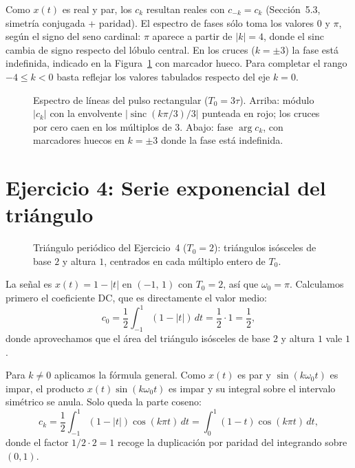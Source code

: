 \documentclass[10pt,a4paper]{article}
\begin{document}
	Como $x(t)$ es real y par, los $c_k$ resultan reales con $c_{-k} = c_k$ (Sección~5.3, simetría conjugada + paridad). El espectro de fases sólo toma los valores $0$ y $\pi$, según el signo del seno cardinal: $\pi$ aparece a partir de $|k| = 4$, donde el sinc cambia de signo respecto del lóbulo central. En los cruces ($k = \pm 3$) la fase está indefinida, indicado en la Figura~\ref{fig:ej3} con marcador hueco. Para completar el rango $-4 \leq k < 0$ basta reflejar los valores tabulados respecto del eje $k = 0$.

	\begin{figure}[H]
		\centering
		
		\caption{Espectro de líneas del pulso rectangular ($T_0 = 3\tau$). Arriba: módulo $|c_k|$ con la envolvente $|\operatorname{sinc}(k\pi/3)/3|$ punteada en rojo; los cruces por cero caen en los múltiplos de $3$. Abajo: fase $\arg c_k$, con marcadores huecos en $k = \pm 3$ donde la fase está indefinida.}
		\label{fig:ej3}
	\end{figure}

	\section*{Ejercicio 4: Serie exponencial del triángulo}

	\begin{figure}[H]
		\centering
		
		\caption{Triángulo periódico del Ejercicio~4 ($T_0 = 2$): triángulos isósceles de base $2$ y altura $1$, centrados en cada múltiplo entero de $T_0$.}
		\label{fig:ej4_senal}
	\end{figure}

	La señal es $x(t) = 1 - |t|$ en $(-1,\, 1)$ con $T_0 = 2$, así que $\omega_0 = \pi$. Calculamos primero el coeficiente DC, que es directamente el valor medio:
	\[
		c_0 = \frac{1}{2}\int_{-1}^{1}(1 - |t|)\,dt = \frac{1}{2}\cdot 1 = \frac{1}{2},
	\]
	donde aprovechamos que el área del triángulo isósceles de base $2$ y altura $1$ vale $1$.

	Para $k \ne 0$ aplicamos la fórmula general. Como $x(t)$ es par y $\sin(k\omega_0 t)$ es impar, el producto $x(t)\sin(k\omega_0 t)$ es impar y su integral sobre el intervalo simétrico se anula. Solo queda la parte coseno:
	\[
		c_k = \frac{1}{2}\int_{-1}^{1}(1 - |t|)\cos(k\pi t)\,dt
		= \int_{0}^{1}(1 - t)\cos(k\pi t)\,dt,
	\]
	donde el factor $1/2 \cdot 2 = 1$ recoge la duplicación por paridad del integrando sobre $(0, 1)$.
\end{document}
